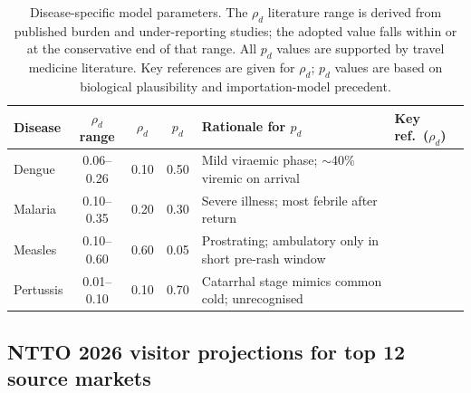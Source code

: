 \documentclass[12pt]{article}
\begin{document}
\begin{table}[h!]
\centering
\caption{Disease-specific model parameters. The $\rho_d$ literature
  range is derived from published burden and under-reporting studies;
  the adopted value falls within or at the conservative end of that
  range. All $p_d$ values are supported by travel medicine literature.
  Key references are given for $\rho_d$; $p_d$ values are based on
  biological plausibility and importation-model precedent.}
\label{tab:params}
\small
\begin{tabular}{lcccp{3.8cm}p{3.5cm}}
\toprule
\textbf{Disease}
  & \textbf{$\rho_d$ range}
  & \textbf{$\rho_d$}
  & \textbf{$p_d$}
  & \textbf{Rationale for $p_d$}
  & \textbf{Key ref.\ ($\rho_d$)} \\
\midrule
Dengue
  & 0.06--0.26 & 0.10 & 0.50
  & Mild viraemic phase; $\sim$40\% viremic on arrival
  & \cite{bhatt2013,undurraga2013} \\[3pt]
Malaria
  & 0.10--0.35 & 0.20 & 0.30
  & Severe illness; most febrile after return
  & \cite{whoWMR2024} \\[3pt]
Measles
  & 0.10--0.60 & 0.60 & 0.05
  & Prostrating; ambulatory only in short pre-rash window
  & \cite{simons2012} \\[3pt]
Pertussis
  & 0.01--0.10 & 0.10 & 0.70
  & Catarrhal stage mimics common cold; unrecognised
  & \cite{mclaughlin2016} \\
\bottomrule
\end{tabular}
\normalsize
\end{table}

\subsection*{NTTO 2026 visitor projections for top 12 source markets}
\end{document}
